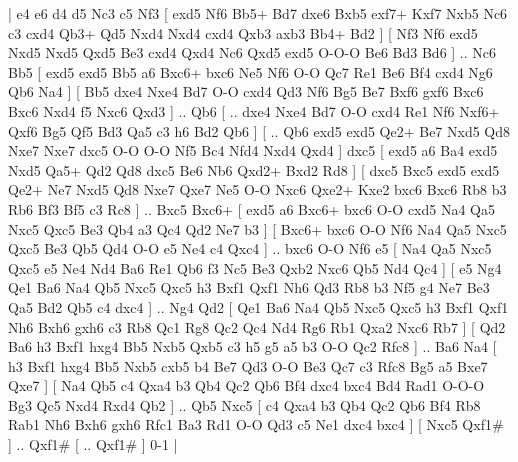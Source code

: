 \makegametitle 
|   e4   e6    d4   d5    Nc3   c5    Nf3 [  exd5 Nf6  Bb5+ Bd7  dxe6 Bxb5  exf7+ Kxf7  Nxb5 Nc6  c3 cxd4  Qb3+ Qd5  Nxd4 Nxd4  cxd4 Qxb3  axb3 Bb4+  Bd2   ]  [  Nf3 Nf6  exd5 Nxd5  Nxd5 Qxd5  Be3 cxd4  Qxd4 Nc6  Qxd5 exd5  O-O-O Be6  Bd3 Bd6   ] .. Nc6    Bb5 [  exd5 exd5  Bb5 a6  Bxc6+ bxc6  Ne5 Nf6  O-O Qc7  Re1 Be6  Bf4 cxd4  Ng6 Qb6  Na4   ]  [  Bb5 dxe4  Nxe4 Bd7  O-O cxd4  Qd3 Nf6  Bg5 Be7  Bxf6 gxf6  Bxc6 Bxc6  Nxd4 f5  Nxc6 Qxd3   ] .. Qb6 [ .. dxe4  Nxe4 Bd7  O-O cxd4  Re1 Nf6  Nxf6+ Qxf6  Bg5 Qf5  Bd3 Qa5  c3 h6  Bd2 Qb6   ]  [ .. Qb6  exd5 exd5  Qe2+ Be7  Nxd5 Qd8  Nxe7 Nxe7  dxc5 O-O  O-O Nf5  Bc4 Nfd4  Nxd4 Qxd4   ]  dxc5 [  exd5 a6  Ba4 exd5  Nxd5 Qa5+  Qd2 Qd8  dxc5 Be6  Nb6 Qxd2+  Bxd2 Rd8   ]  [  dxc5 Bxc5  exd5 exd5  Qe2+ Ne7  Nxd5 Qd8  Nxe7 Qxe7  Ne5 O-O  Nxc6 Qxe2+  Kxe2 bxc6  Bxc6 Rb8  b3 Rb6  Bf3 Bf5  c3 Rc8   ] .. Bxc5    Bxc6+ [  exd5 a6  Bxc6+ bxc6  O-O cxd5  Na4 Qa5  Nxc5 Qxc5  Be3 Qb4  a3 Qc4  Qd2 Ne7  b3   ]  [  Bxc6+ bxc6  O-O Nf6  Na4 Qa5  Nxc5 Qxc5  Be3 Qb5  Qd4 O-O  e5 Ne4  c4 Qxc4   ] .. bxc6    O-O   Nf6    e5 [  Na4 Qa5  Nxc5 Qxc5  e5 Ne4  Nd4 Ba6  Re1 Qb6  f3 Nc5  Be3 Qxb2  Nxc6 Qb5  Nd4 Qc4   ]  [  e5 Ng4  Qe1 Ba6  Na4 Qb5  Nxc5 Qxc5  h3 Bxf1  Qxf1 Nh6  Qd3 Rb8  b3 Nf5  g4 Ne7  Be3 Qa5  Bd2 Qb5  c4 dxc4   ] .. Ng4    Qd2 [  Qe1 Ba6  Na4 Qb5  Nxc5 Qxc5  h3 Bxf1  Qxf1 Nh6  Bxh6 gxh6  c3 Rb8  Qc1 Rg8  Qc2 Qc4  Nd4 Rg6  Rb1 Qxa2  Nxc6 Rb7   ]  [  Qd2 Ba6  h3 Bxf1  hxg4 Bb5  Nxb5 Qxb5  c3 h5  g5 a5  b3 O-O  Qc2 Rfc8   ] .. Ba6    Na4 [  h3 Bxf1  hxg4 Bb5  Nxb5 cxb5  b4 Be7  Qd3 O-O  Be3 Qc7  c3 Rfc8  Bg5 a5  Bxe7 Qxe7   ]  [  Na4 Qb5  c4 Qxa4  b3 Qb4  Qc2 Qb6  Bf4 dxc4  bxc4 Bd4  Rad1 O-O-O  Bg3 Qc5  Nxd4 Rxd4  Qb2   ] .. Qb5    Nxc5 [  c4 Qxa4  b3 Qb4  Qc2 Qb6  Bf4 Rb8  Rab1 Nh6  Bxh6 gxh6  Rfc1 Ba3  Rd1 O-O  Qd3 c5  Ne1 dxc4  bxc4   ]  [  Nxc5 Qxf1#   ] .. Qxf1#    [ .. Qxf1#   ] 0-1  |
